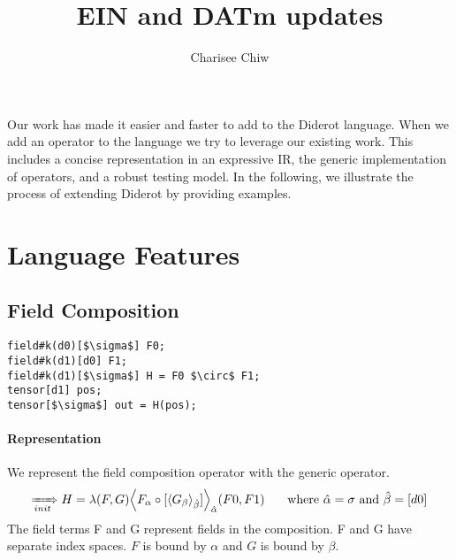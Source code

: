\documentclass{article}
\title{EIN and DATm updates}
\author{Charisee Chiw}
\begin{document}
\maketitle 

Our work has made it easier and faster to add to the Diderot language.
When we add an operator to the language we try to leverage our existing work.
This includes a concise representation in an expressive IR, the generic implementation of operators, and a robust testing model.
In the following, we illustrate the process of extending Diderot by providing examples.


\section{Language Features}
\subsection{Field Composition}

\begin{lstlisting}
field#k(d0)[$\sigma$] F0;
field#k(d1)[d0] F1;
field#k(d1)[$\sigma$] H = F0 $\circ$ F1; 
tensor[d1] pos;
tensor[$\sigma$] out = H(pos);
\end{lstlisting}

\paragraph{Representation}
We represent the field composition operator with the generic \name{} operator.
$$\rewriteInitA  H= \lambda(F,G) \EinExp{\expComp{F_\alpha}{G_\beta}{\beta}}{\hat{\alpha}}(F0,F1) \indent\text{ where } \hat{\alpha}=\sigma \text{ and } \hat{\beta} =[d0]$$
The field terms F and G represent fields in the composition.
F and G have separate index spaces. $F$ is bound by $\alpha$ and $G$ is bound by $\beta$.\\
 
\end{document}
